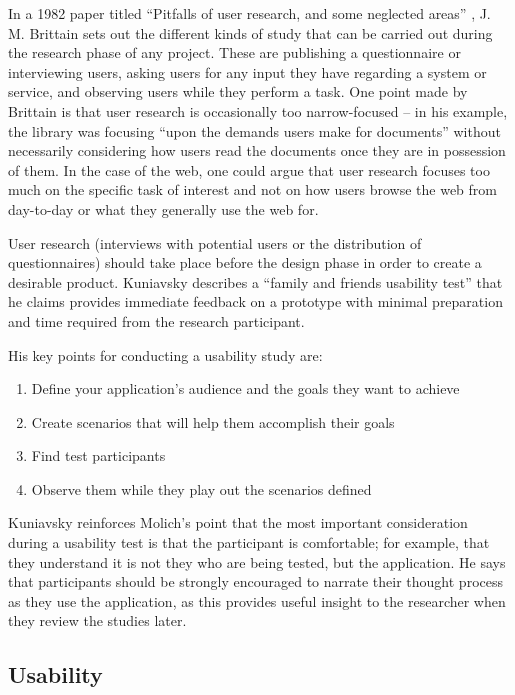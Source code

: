\documentclass[draft]{scrartcl}
\begin{document}
In a 1982 paper titled ``Pitfalls of user research, and some neglected areas''
\cite{brittain1982pitfalls}, J. M. Brittain sets out the different kinds of
study that can be carried out during the research phase of any project. These
are publishing a questionnaire or interviewing users, asking users for any
input they have regarding a system or service, and observing users while they
perform a task. One point made by Brittain is that user research is
occasionally too narrow-focused -- in his example, the library was focusing
``upon the demands users make for documents'' without necessarily considering
how users read the documents once they are in possession of them. In the case
of the web, one could argue that user research focuses too much on the
specific task of interest and not on how users browse the web from day-to-day
or what they generally use the web for.

User research (interviews with potential users or the distribution of
questionnaires) should take place before the design phase in order to create a
desirable product. Kuniavsky \cite{kuniavsky2003userexperience} describes a
``family and friends usability test'' that he claims provides immediate
feedback on a prototype with minimal preparation and time required from the
research participant.

His key points for conducting a usability study are:

\begin{enumerate}
  \item Define your application's audience and the goals they want to achieve
  \item Create scenarios that will help them accomplish their goals
  \item Find test participants
  \item Observe them while they play out the scenarios defined
\end{enumerate}

Kuniavsky reinforces Molich's point that the most important consideration
during a usability test is that the participant is comfortable; for example,
that they understand it is not they who are being tested, but the application.
He says that participants should be strongly encouraged to narrate their
thought process as they use the application, as this provides useful insight
to the researcher when they review the studies later.

\subsection{Usability}
\end{document}

